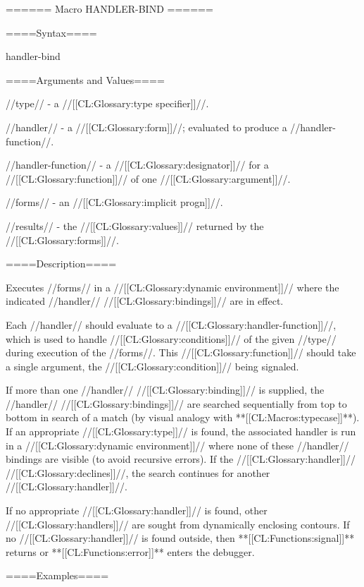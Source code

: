 ====== Macro HANDLER-BIND ======

====Syntax====

\DefmacWithValues handler-bind { } {}


====Arguments and Values====

//type// - a //[[CL:Glossary:type specifier]]//.

//handler// - a //[[CL:Glossary:form]]//; evaluated to produce a //handler-function//.

//handler-function// - a //[[CL:Glossary:designator]]// for a //[[CL:Glossary:function]]// of one //[[CL:Glossary:argument]]//.

//forms// - an //[[CL:Glossary:implicit progn]]//.

//results// - the //[[CL:Glossary:values]]// returned by the //[[CL:Glossary:forms]]//.

====Description====

Executes //forms// in a //[[CL:Glossary:dynamic environment]]// where the indicated //handler// //[[CL:Glossary:bindings]]// are in effect.

Each //handler// should evaluate to a //[[CL:Glossary:handler-function]]//, which is used to handle //[[CL:Glossary:conditions]]// of the given //type// during execution of the //forms//. This //[[CL:Glossary:function]]// should take a single argument, the //[[CL:Glossary:condition]]// being signaled.

If more than one //handler// //[[CL:Glossary:binding]]// is supplied, the //handler// //[[CL:Glossary:bindings]]// are searched sequentially from top to bottom in search of a match (by visual analogy with **[[CL:Macros:typecase]]**). If an appropriate //[[CL:Glossary:type]]// is found, the associated handler is run in a //[[CL:Glossary:dynamic environment]]// where none of these //handler// bindings are visible (to avoid recursive errors). If the //[[CL:Glossary:handler]]// //[[CL:Glossary:declines]]//, the search continues for another //[[CL:Glossary:handler]]//.

If no appropriate //[[CL:Glossary:handler]]// is found, other //[[CL:Glossary:handlers]]// are sought from dynamically enclosing contours. If no //[[CL:Glossary:handler]]// is found outside, then **[[CL:Functions:signal]]** returns or **[[CL:Functions:error]]** enters the debugger.

====Examples====



